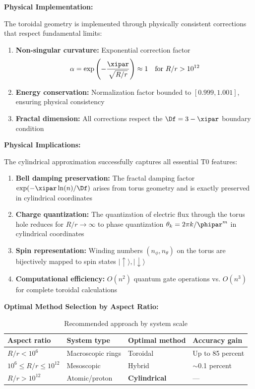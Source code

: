 \textbf{Physical Implementation:}

The toroidal geometry is implemented through physically consistent corrections that respect fundamental limits:

\begin{enumerate}
	\item \textbf{Non-singular curvature:} Exponential correction factor 
	\[
	\alpha = \exp\left(-\frac{\xipar}{\sqrt{R/r}}\right) \approx 1 \quad \text{for } R/r > 10^{12}
	\]
	
	\item \textbf{Energy conservation:} Normalization factor bounded to $[0.999, 1.001]$, 
	ensuring physical consistency
	
	\item \textbf{Fractal dimension:} All corrections respect the $\Df = 3 - \xipar$ boundary condition
\end{enumerate}

\textbf{Physical Implications:}

The cylindrical approximation successfully captures all essential T0 features:

\begin{enumerate}
	\item \textbf{Bell damping preservation:} The fractal damping factor 
	$\exp(-\xipar\ln(n)/\Df)$ arises from torus geometry and is exactly preserved in cylindrical coordinates
	
	\item \textbf{Charge quantization:} The quantization of electric flux through the torus hole reduces for $R/r \to \infty$ to phase quantization 
	$\theta_k = 2\pi k / \phipar^m$ in cylindrical coordinates
	
	\item \textbf{Spin representation:} Winding numbers $(n_\phi, n_\theta)$ on the torus are bijectively mapped to spin states $|\uparrow\rangle, |\downarrow\rangle$
	
	\item \textbf{Computational efficiency:} $O(n^2)$ quantum gate operations vs. $O(n^3)$ for complete toroidal calculations
\end{enumerate}

\textbf{Optimal Method Selection by Aspect Ratio:}

\begin{table}[h]
	\centering
	\caption{Recommended approach by system scale}
	\label{tab:method_by_scale}
	\begin{tabular}{@{}llll@{}}
		\toprule
		Aspect ratio & System type & Optimal method & Accuracy gain \\
		\midrule
		$R/r < 10^6$ & Macroscopic rings & Toroidal & Up to 85 percent \\
		$10^6 \leq R/r \leq 10^{12}$ & Mesoscopic & Hybrid & $\sim$0.1 percent \\
		$R/r > 10^{12}$ & Atomic/proton & \textbf{Cylindrical} & --- \\
		\bottomrule
	\end{tabular}
\end{table}

